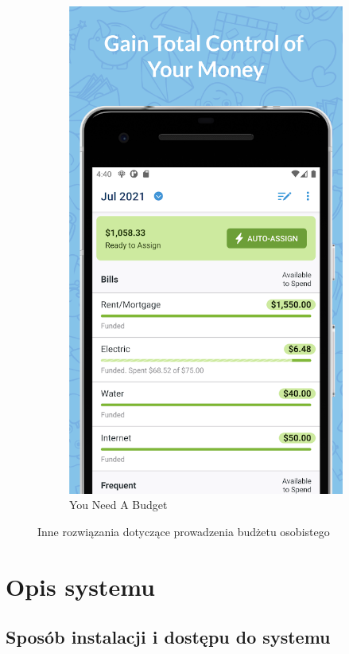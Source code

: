 \documentclass[shortabstract,inz]{iithesis}
\begin{document}
\begin{figure}
\begin{subfigure}{0.45\textwidth}
    \includegraphics[width=\textwidth]{ynab.png}
    \caption{You Need A Budget}
    \label{fig:ynab}
\end{subfigure}     
\caption{Inne rozwiązania dotyczące prowadzenia budżetu osobistego}
\label{fig:mint-ynab}
\end{figure}
\chapter{Opis systemu}
\section{Sposób instalacji i dostępu do systemu}
\end{document}
